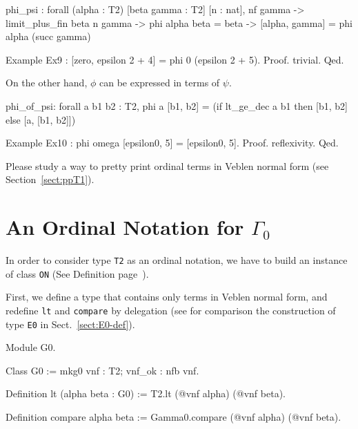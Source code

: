 {\begin{Coqanswer}
phi_psi :
forall (alpha : T2) [beta gamma : T2] [n : nat],
nf gamma ->
limit_plus_fin beta n gamma ->
phi alpha beta = beta -> [alpha, gamma] = phi alpha (succ gamma)
\end{Coqanswer}

\begin{Coqsrc}
Example Ex9 : [zero, epsilon 2 + 4] = phi 0 (epsilon 2 + 5).
Proof. trivial. Qed.
\end{Coqsrc}

On the other hand, $\phi$ can be expressed in terms of $\psi$.

\begin{Coqanswer}
phi_of_psi:
  forall a b1 b2 : T2,
  phi a [b1, b2] = (if lt_ge_dec a b1 then [b1, b2] else [a, [b1, b2]])
\end{Coqanswer}

\begin{Coqsrc}
Example Ex10 : phi omega [epsilon0, 5] = [epsilon0, 5].
Proof. reflexivity. Qed.
\end{Coqsrc}

\begin{project}
Please study a way to pretty print ordinal terms in Veblen normal form (see Section~\vref{sect:ppT1}).
\end{project}

\section{An Ordinal Notation for \texorpdfstring{$\Gamma_0$}{\texttt{Gamma0}}}

In order to consider type \texttt{T2} as an ordinal notation, we have to build an instance of class \texttt{ON} (See Definition page~\pageref{types:ON}).

First, we define a type that contains only terms in Veblen normal form, and redefine \texttt{lt} and \texttt{compare} by delegation (see for comparison the construction of type \texttt{E0} in Sect.~\vref{sect:E0-def}).

\begin{Coqsrc}
Module G0.

Class G0 := mkg0 {vnf : T2; vnf_ok : nfb vnf}.

Definition lt (alpha beta : G0) := T2.lt (@vnf alpha) (@vnf beta).

Definition compare alpha beta := Gamma0.compare (@vnf alpha) (@vnf beta).
\end{Coqsrc}

}
